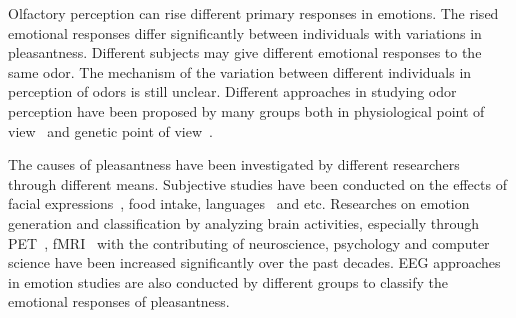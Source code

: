 \documentclass[conference]{IEEEtran}
\begin{document}
%




Olfactory perception can rise different primary responses in emotions. The rised emotional responses differ significantly between individuals with variations in pleasantness. Different subjects may give different emotional responses to the same odor. The mechanism of the variation between different individuals in perception of odors is still unclear. Different approaches in studying odor perception have been proposed by many groups both in physiological point of view~\cite{galizia2000odour} and genetic point of view~\cite{keller2007genetic}.

The causes of pleasantness have been investigated by different researchers through different means. Subjective studies have been conducted on the effects of facial expressions~\cite{lyons1998coding}, food intake\cite{de2003taste}, languages~\cite{bellezza1986words} and etc. Researches on emotion generation and classification by analyzing brain activities, especially through PET~\cite{zatorre2000neural}, fMRI~\cite{kringelbach2003activation} with the contributing of neuroscience, psychology and computer science have been increased significantly over the past decades. EEG approaches in emotion studies are also conducted by different groups to classify the emotional responses of pleasantness.
\end{document}
